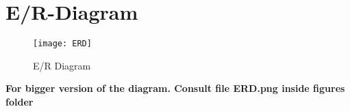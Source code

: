 \newpage
\section{E/R-Diagram}

\begin{figure}[h]
    \centering
    \texttt{[image: ERD]}
    \caption{E/R Diagram}
    \label{E/R-Diagram}
\end{figure}
\textbf{For bigger version of the diagram. Consult file ERD.png inside figures folder}